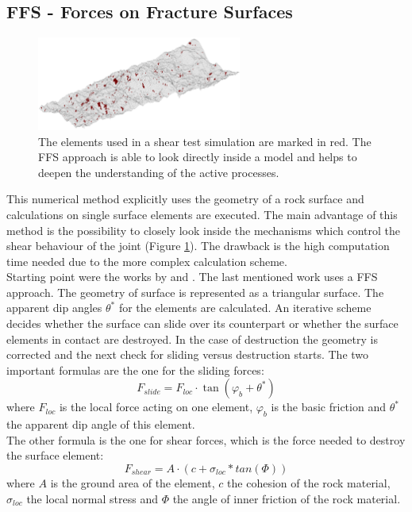\subsection{FFS - Forces on Fracture Surfaces}
\label{chap:NumPlatf:FFS}
\begin{figure}[htb!]
\begin{center}
\includegraphics[width=0.6\textwidth]{./figures/FFS_MarkedSurfaceElements.png}
\end{center}
\caption{The elements used in a shear test simulation are marked in red. The FFS approach is able to look directly inside a model and helps to deepen the understanding of the active processes.}
\label{Fig:FFS-MarkedElements}
\end{figure}
This numerical method explicitly uses the geometry of a rock surface and calculations on single surface elements are executed. The main advantage of this method is the possibility to closely look inside the mechanisms which control the shear behaviour of the joint (Figure \ref{Fig:FFS-MarkedElements}). The drawback is the high computation time needed due to the more complex calculation scheme.\\
Starting point were the works by \cite{Fathi2016} and \cite{Casagrande2017}. The last mentioned work uses a FFS approach. The geometry of surface is represented as a triangular surface. The apparent dip angles $\theta^\ast$ for the elements are calculated. An iterative scheme decides whether the surface can slide over its counterpart or whether the surface elements in contact are destroyed. In the case of destruction the geometry is corrected and the next check for sliding versus destruction starts. The two important formulas are the one for the sliding forces: 
\begin{equation}
F_{slide}=F_{loc} \cdot \tan (\varphi_b + \theta^\ast)
\end{equation}
where $F_{loc}$ is the local force acting on one element, $\varphi_b$ is the basic friction and $\theta^\ast$ the apparent dip angle of this element.\\
The other formula is the one for shear forces, which is the force needed to destroy the surface element:
\begin{equation}\label{eq:shear}
F_{shear}=A \cdot (c + \sigma_{loc}*tan(\Phi))
\end{equation}
where $A$ is the ground area of the element, $c$ the cohesion of the rock material, $\sigma_{loc}$ the local normal stress and $\Phi$ the angle of inner friction of the rock material.



